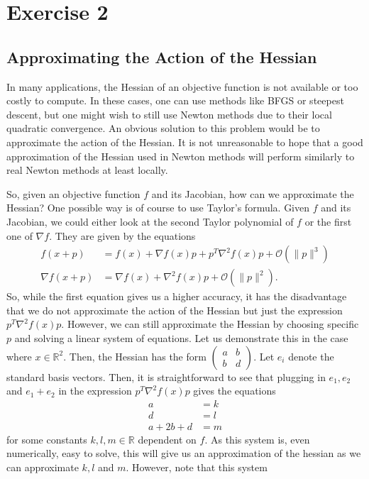 \documentclass{article}
\begin{document}
\section{Exercise 2}
\subsection{Approximating the Action of the Hessian}
In many applications, the Hessian of an objective function is not available or
too costly to compute. In these cases, one can  use methods like
BFGS or steepest descent, but one might wish to still  use Newton methods due
to their local quadratic convergence. An obvious solution to this problem
would be to approximate the action of the Hessian. It is not unreasonable
to hope that a good approximation of the Hessian used in Newton methods will perform similarly to
real Newton methods at least locally. \par
So, given an objective function $f$ and its Jacobian, how can we approximate
the Hessian? One possible way is of course to use Taylor's formula. Given $f$ and its Jacobian, we could either look at the second Taylor polynomial of $f$ or
the first one of $\nabla f$. They are given by the equations
\begin{align}
  f(x+p)&=f(x) +\nabla f(x)p +p^{T} \nabla^{2} f(x) p + \mathcal{O}(\|p\|^{3}) \\
\nabla f(x+p) & = \nabla f(x) + \nabla^{2}f(x)p+\mathcal{O}(\|p\|^{2}).
\end{align}
So, while the first equation gives us a higher accuracy, it has the disadvantage
that we do not approximate the action of the Hessian but just the expression $p^{T} \nabla^{2} f(x) p$. 
However, we can still approximate the Hessian by choosing specific $p$ and solving a linear system of equations.
Let us demonstrate this in the case where $x\in \mathbb{R}^{2}$. Then, the Hessian has the form $\begin{pmatrix}a & b \\ b & d\end{pmatrix}$. Let $e_{i}$ denote
the standard basis vectors. Then, it is straightforward to see that
plugging in $e_1,e_2$ and $e_{1}+e_{2}$ in the expression $p^{T} \nabla^{2} f(x) p$ gives the equations
\begin{align*}
  a&=k  \\
  d&=l  \\
  a+2b+d&=m 
\end{align*}
for some constants $k,l,m \in \mathbb{R}$ dependent on $f$. As this system is,
even numerically, easy to solve, this will give us an approximation of the hessian as we can approximate $k,l$ and $m$. However, note that this system
\end{document}
